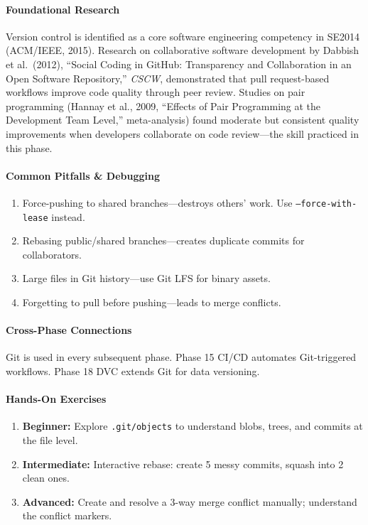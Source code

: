 \documentclass[11pt, a4paper, oneside]{report}
\begin{document}
\paragraph{Foundational Research} Version control is identified as a core software engineering competency in SE2014 (ACM/IEEE, 2015). Research on collaborative software development by Dabbish et al.\ (2012), ``Social Coding in GitHub: Transparency and Collaboration in an Open Software Repository,'' \emph{CSCW}, demonstrated that pull request-based workflows improve code quality through peer review. Studies on pair programming (Hannay et al., 2009, ``Effects of Pair Programming at the Development Team Level,'' meta-analysis) found moderate but consistent quality improvements when developers collaborate on code review---the skill practiced in this phase.


\paragraph{Common Pitfalls \& Debugging}
\begin{enumerate}[leftmargin=*]
\item Force-pushing to shared branches---destroys others' work. Use \texttt{--force-with-lease} instead.
\item Rebasing public/shared branches---creates duplicate commits for collaborators.
\item Large files in Git history---use Git LFS for binary assets.
\item Forgetting to pull before pushing---leads to merge conflicts.
\end{enumerate}

\paragraph{Cross-Phase Connections} Git is used in every subsequent phase. Phase 15 CI/CD automates Git-triggered workflows. Phase 18 DVC extends Git for data versioning.

\paragraph{Hands-On Exercises}
\begin{enumerate}[leftmargin=*]
\item \textbf{Beginner:} Explore \texttt{.git/objects} to understand blobs, trees, and commits at the file level.
\item \textbf{Intermediate:} Interactive rebase: create 5 messy commits, squash into 2 clean ones.
\item \textbf{Advanced:} Create and resolve a 3-way merge conflict manually; understand the conflict markers.
\end{enumerate}
\end{document}
